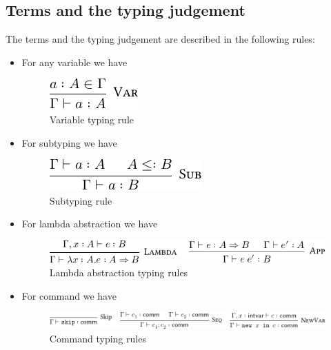\documentclass[12pt,twoside,a4paper]{report}
\theoremstyle{definition}
\theoremstyle{definition}
\theoremstyle{definition}
\theoremstyle{definition}
\begin{document}
        \subsection{Terms and the typing judgement} \label{subsec: terms}
        The terms and the typing judgement are described in the following rules:
        \begin{itemize}
            \item For any variable we have 
                \begin{figure}[H]
                    \centering
                    \includegraphics{source_terms_var.pdf}
                    \caption{Variable typing rule}
                    \label{fig: rule_var}
                \end{figure}
            \item For subtyping we have
                \begin{figure}[H]
                    \centering
                    \includegraphics{source_terms_subtype.pdf}
                    \caption{Subtyping rule}
                    \label{fig: rule_subtype}
                \end{figure}
            \item For lambda abstraction we have
                \begin{figure}[H]
                    \centering
                    \includegraphics{source_terms_lambda.pdf}
                    \caption{Lambda abstraction typing rules}
                    \label{fig: rule_lambda}
                \end{figure}
            \item For command we have
                \begin{figure}[H]
                    \centering
                    \includegraphics{source_terms_comm.pdf}
                    \caption{Command typing rules}

\end{figure}
\end{itemize}
\end{document}
